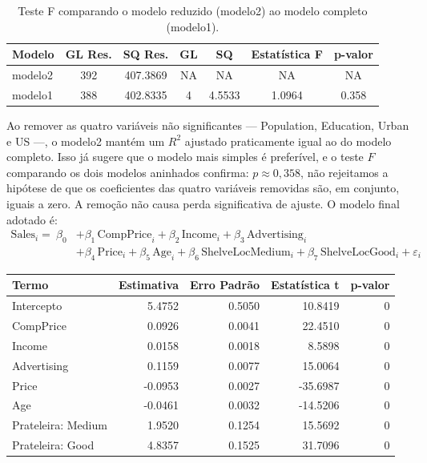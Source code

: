 \documentclass[a4paper]{modeloUFCG} %
\begin{document}
\begin{table}

\caption{\label{tab:anovaSelecao}Teste F comparando o modelo reduzido (modelo2) ao modelo completo (modelo1).}
\centering
\begin{tabular}[t]{l|c|c|c|c|c|c}
\hline
Modelo & GL Res. & SQ Res. & GL & SQ & Estatística F & p-valor\\
\hline
modelo2 & 392 & 407.3869 & NA & NA & NA & NA\\
\hline
modelo1 & 388 & 402.8335 & 4 & 4.5533 & 1.0964 & 0.358\\
\hline
\end{tabular}
\end{table}

Ao remover as quatro variáveis não significantes --- Population, Education, Urban e US ---, o modelo2 mantém um \(R^2\) ajustado praticamente igual ao do modelo completo. Isso já sugere que o modelo mais simples é preferível, e o teste \(F\) comparando os dois modelos aninhados confirma: \(p \approx 0{,}358\), não rejeitamos a hipótese de que os coeficientes das quatro variáveis removidas são, em conjunto, iguais a zero. A remoção não causa perda significativa de ajuste. O modelo final adotado é:
\[
\begin{aligned}
\text{Sales}_i = \ \beta_0 &+ \beta_1\,\text{CompPrice}_i + \beta_2\,\text{Income}_i + \beta_3\,\text{Advertising}_i \\
&+ \beta_4\,\text{Price}_i + \beta_5\,\text{Age}_i + \beta_6\,\text{ShelveLocMedium}_i + \beta_7\,\text{ShelveLocGood}_i + \varepsilon_i
\end{aligned}
\]

\begin{tabular}{l|r|r|r|r}
\hline
Termo & Estimativa & Erro Padrão & Estatística t & p-valor\\
\hline
Intercepto & 5.4752 & 0.5050 & 10.8419 & 0\\
\hline
CompPrice & 0.0926 & 0.0041 & 22.4510 & 0\\
\hline
Income & 0.0158 & 0.0018 & 8.5898 & 0\\
\hline
Advertising & 0.1159 & 0.0077 & 15.0064 & 0\\
\hline
Price & -0.0953 & 0.0027 & -35.6987 & 0\\
\hline
Age & -0.0461 & 0.0032 & -14.5206 & 0\\
\hline
Prateleira: Medium & 1.9520 & 0.1254 & 15.5692 & 0\\
\hline
Prateleira: Good & 4.8357 & 0.1525 & 31.7096 & 0\\
\hline
\end{tabular}
\end{document}
